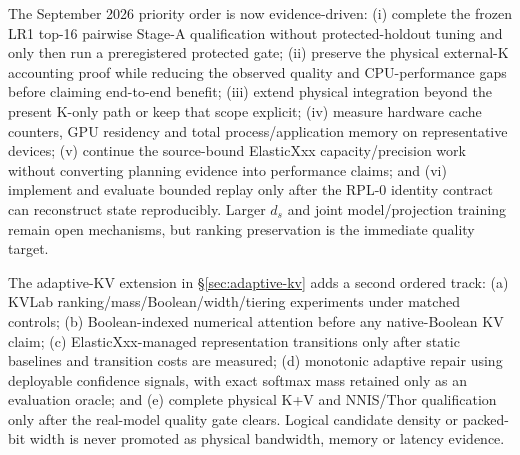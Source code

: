 \documentclass[11pt]{article}
\newenvironment{addedblock}{\begingroup\color{revisionblue}}{\endgroup}
\theoremstyle{plain}
\theoremstyle{definition}
\newcommand{\ds}{d_s}
\begin{document}
\begin{addedblock}
The September 2026 priority order is now evidence-driven:
(i) complete the frozen LR1 top-16 pairwise Stage-A qualification without
protected-holdout tuning and only then run a preregistered protected gate;
(ii) preserve the physical external-K accounting proof while reducing the
observed quality and CPU-performance gaps before claiming end-to-end benefit;
(iii) extend physical integration beyond the present K-only path or keep that
scope explicit; (iv) measure hardware cache counters, GPU residency and total
process/application memory on representative devices; (v) continue the
source-bound ElasticXxx capacity/precision work without converting planning
evidence into performance claims; and (vi) implement and evaluate bounded replay
only after the RPL-0 identity contract can reconstruct state reproducibly.
Larger $\ds$ and joint model/projection training remain open mechanisms, but
ranking preservation is the immediate quality target.

The adaptive-KV extension in \S\ref{sec:adaptive-kv} adds a second ordered
track: (a) KVLab ranking/mass/Boolean/width/tiering experiments under matched
controls; (b) Boolean-indexed numerical attention before any native-Boolean KV
claim; (c) ElasticXxx-managed representation transitions only after static
baselines and transition costs are measured; (d) monotonic adaptive repair
using deployable confidence signals, with exact softmax mass retained only as
an evaluation oracle; and (e) complete physical K+V and NNIS/Thor
qualification only after the real-model quality gate clears. Logical candidate
density or packed-bit width is never promoted as physical bandwidth, memory or
latency evidence.
\end{addedblock}
\end{document}
